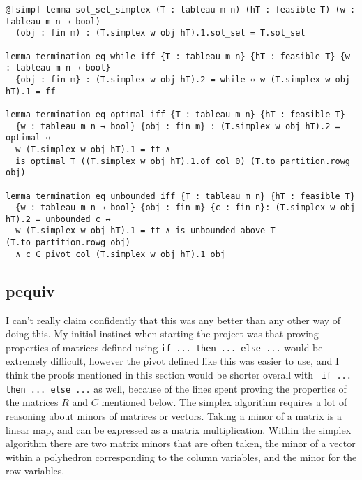 \documentclass[11pt]{article} %
\begin{document}
\begin{lstlisting}
@[simp] lemma sol_set_simplex (T : tableau m n) (hT : feasible T) (w : tableau m n → bool)
  (obj : fin m) : (T.simplex w obj hT).1.sol_set = T.sol_set

lemma termination_eq_while_iff {T : tableau m n} {hT : feasible T} {w : tableau m n → bool}
  {obj : fin m} : (T.simplex w obj hT).2 = while ↔ w (T.simplex w obj hT).1 = ff

lemma termination_eq_optimal_iff {T : tableau m n} {hT : feasible T}
  {w : tableau m n → bool} {obj : fin m} : (T.simplex w obj hT).2 = optimal ↔
  w (T.simplex w obj hT).1 = tt ∧
  is_optimal T ((T.simplex w obj hT).1.of_col 0) (T.to_partition.rowg obj)

lemma termination_eq_unbounded_iff {T : tableau m n} {hT : feasible T}
  {w : tableau m n → bool} {obj : fin m} {c : fin n}: (T.simplex w obj hT).2 = unbounded c ↔
  w (T.simplex w obj hT).1 = tt ∧ is_unbounded_above T (T.to_partition.rowg obj)
  ∧ c ∈ pivot_col (T.simplex w obj hT).1 obj
\end{lstlisting}

\subsection{pequiv}
\color{red} I can't really claim confidently that this was any better than any other way of doing this. My initial instinct when starting the project was that proving properties of matrices defined using \lstinline|if ... then ... else ...| would be extremely difficult, however the pivot defined like this was easier to use, and I think the proofs mentioned in this section would be shorter overall with \lstinline| if ... then ... else ...| as well, because of the lines spent proving the properties of the matrices $R$ and $C$ mentioned below. \color{black}
The simplex algorithm requires a lot of reasoning about minors of matrices or vectors. Taking a minor of a matrix is a linear map, and can be expressed as a matrix multiplication. Within the simplex algorithm there are two matrix minors that are often taken, the minor of a vector within a polyhedron corresponding to the column variables, and the minor for the row variables.
\end{document}
